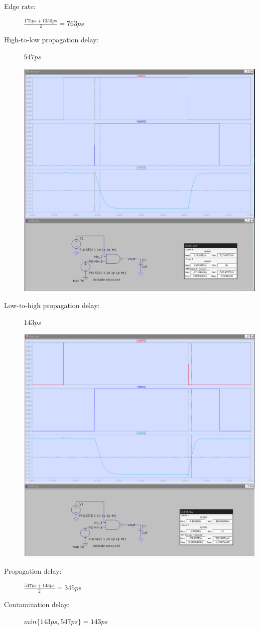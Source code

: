 \documentclass[a4paper, 11pt]{article}
\begin{document}
\begin{description}
\begin{center}
	      \end{center}
	\item[Edge rate:] $\frac{175ps + 1350ps}{2} = 763ps$
	\item[High-to-low propagation delay:] $547ps$ \hfill
	      \begin{center}
		      \includegraphics[scale=0.3]{images/high_to_low.png}
	      \end{center}
	\item[Low-to-high propagation delay:] $143ps$ \hfill
	      \begin{center}
		      \includegraphics[scale=0.3]{images/low_to_high.png}
	      \end{center}
	\item[Propagation delay:] $\frac{547ps + 143ps}{2} = 345ps $
	\item[Contamination delay:] $ min\{143ps, 547ps\} = 143ps $
\end{description}
\end{document}
